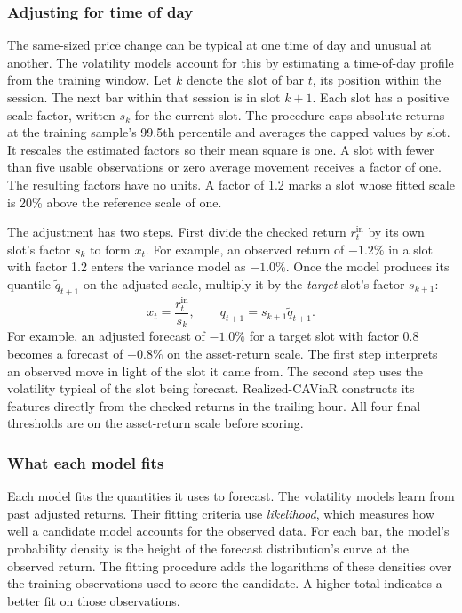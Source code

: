 \documentclass[
	12pt,				%
	openright,			%
	twoside,			%
	a4paper,
	chapter=TITLE,
	english				%
	]{abntex2}
\begin{document}
\subsubsection{Adjusting for time of day} \label{sec:seasonality}

The same-sized price change can be typical at one time of day and unusual at another. The volatility models account for this by estimating a time-of-day profile from the training window. Let $k$ denote the slot of bar $t$, its position within the session. The next bar within that session is in slot $k+1$. Each slot has a positive scale factor, written $s_k$ for the current slot. The procedure caps absolute returns at the training sample's 99.5th percentile and averages the capped values by slot. It rescales the estimated factors so their mean square is one. A slot with fewer than five usable observations or zero average movement receives a factor of one. The resulting factors have no units. A factor of 1.2 marks a slot whose fitted scale is 20\% above the reference scale of one.

The adjustment has two steps. First divide the checked return $r_t^{\mathrm{in}}$ by its own slot's factor $s_k$ to form $x_t$. For example, an observed return of $-1.2\%$ in a slot with factor 1.2 enters the variance model as $-1.0\%$. Once the model produces its quantile $\widetilde q_{t+1}$ on the adjusted scale, multiply it by the \emph{target} slot's factor $s_{k+1}$:
\begin{equation}
  x_t=\frac{r_t^{\mathrm{in}}}{s_k},\qquad
  q_{t+1}=s_{k+1}\widetilde q_{t+1}.
  \label{eq:slot-adjustment}
\end{equation}
For example, an adjusted forecast of $-1.0\%$ for a target slot with factor 0.8 becomes a forecast of $-0.8\%$ on the asset-return scale. The first step interprets an observed move in light of the slot it came from. The second step uses the volatility typical of the slot being forecast. Realized-CAViaR constructs its features directly from the checked returns in the trailing hour. All four final thresholds are on the asset-return scale before scoring.

\subsubsection{What each model fits}

Each model fits the quantities it uses to forecast. The volatility models learn from past adjusted returns. Their fitting criteria use \emph{likelihood}, which measures how well a candidate model accounts for the observed data. For each bar, the model's probability density is the height of the forecast distribution's curve at the observed return. The fitting procedure adds the logarithms of these densities over the training observations used to score the candidate. A higher total indicates a better fit on those observations.
\end{document}
